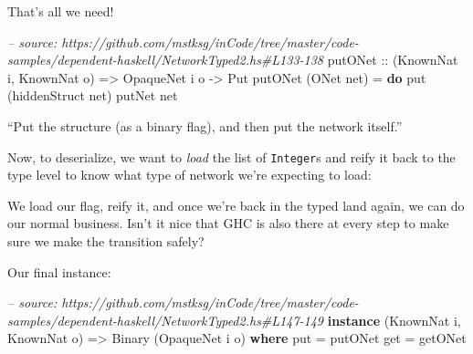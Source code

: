 \documentclass[]{article}
\newenvironment{Shaded}{\begin{snugshade}}{\end{snugshade}}
\newcommand{\CommentTok}[1]{\textcolor[rgb]{0.56,0.35,0.01}{\textit{#1}}}
\newcommand{\DataTypeTok}[1]{\textcolor[rgb]{0.13,0.29,0.53}{#1}}
\newcommand{\FunctionTok}[1]{\textcolor[rgb]{0.00,0.00,0.00}{#1}}
\newcommand{\KeywordTok}[1]{\textcolor[rgb]{0.13,0.29,0.53}{\textbf{#1}}}
\newcommand{\NormalTok}[1]{#1}
\newcommand{\OtherTok}[1]{\textcolor[rgb]{0.56,0.35,0.01}{#1}}
\begin{document}
That's all we need!

\begin{Shaded}
\begin{Highlighting}[]
\CommentTok{-- source: https://github.com/mstksg/inCode/tree/master/code-samples/dependent-haskell/NetworkTyped2.hs#L133-138}
\OtherTok{putONet ::}\NormalTok{ (}\DataTypeTok{KnownNat}\NormalTok{ i, }\DataTypeTok{KnownNat}\NormalTok{ o)}
        \OtherTok{=>} \DataTypeTok{OpaqueNet}\NormalTok{ i o}
        \OtherTok{->} \DataTypeTok{Put}
\NormalTok{putONet (}\DataTypeTok{ONet}\NormalTok{ net) }\FunctionTok{=} \KeywordTok{do}
\NormalTok{    put (hiddenStruct net)}
\NormalTok{    putNet net}
\end{Highlighting}
\end{Shaded}

``Put the structure (as a binary flag), and then put the network itself.''

Now, to deserialize, we want to \emph{load} the list of \texttt{Integer}s and
reify it back to the type level to know what type of network we're expecting to
load:

\begin{Shaded}
\end{Shaded}

We load our flag, reify it, and once we're back in the typed land again, we can
do our normal business. Isn't it nice that GHC is also there at every step to
make sure we make the transition safely?

Our final instance:

\begin{Shaded}
\begin{Highlighting}[]
\CommentTok{-- source: https://github.com/mstksg/inCode/tree/master/code-samples/dependent-haskell/NetworkTyped2.hs#L147-149}
\KeywordTok{instance}\NormalTok{ (}\DataTypeTok{KnownNat}\NormalTok{ i, }\DataTypeTok{KnownNat}\NormalTok{ o) }\OtherTok{=>} \DataTypeTok{Binary}\NormalTok{ (}\DataTypeTok{OpaqueNet}\NormalTok{ i o) }\KeywordTok{where}
\NormalTok{    put }\FunctionTok{=}\NormalTok{ putONet}
\NormalTok{    get }\FunctionTok{=}\NormalTok{ getONet}
\end{Highlighting}
\end{Shaded}
\end{document}
